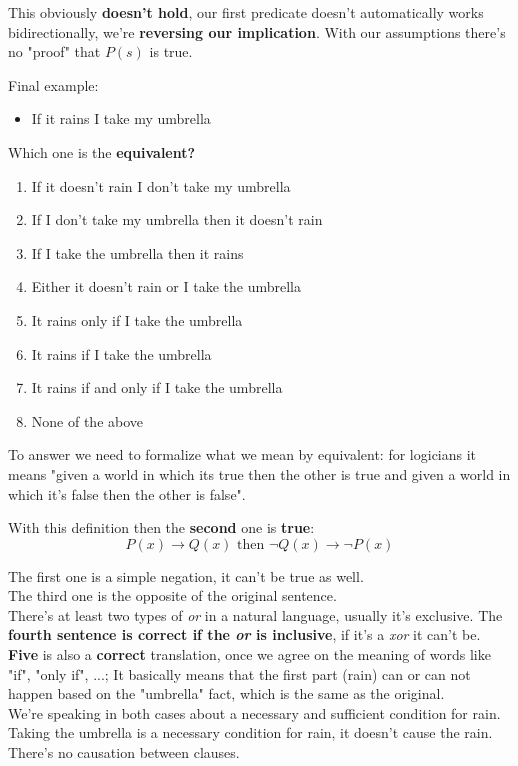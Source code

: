 	This obviously \textbf{doesn't hold}, our first predicate doesn't automatically works bidirectionally, we're \textbf{reversing our implication}. With our assumptions there's no "proof" that $P(s)$ is true.

	\begin{example} Final example:
	\begin{itemize}
		\item If it rains I take my umbrella
	\end{itemize}
	\end{example}

	Which one is the \textbf{equivalent?}
	\begin{enumerate}
		\item If it doesn't rain I don't take my umbrella
		\item If I don't take my umbrella then it doesn't rain
		\item If I take the umbrella then it rains
		\item Either it doesn't rain or I take the umbrella
		\item It rains only if I take the umbrella
		\item It rains if I take the umbrella
		\item It rains if and only if I take the umbrella
		\item None of the above
	\end{enumerate}

	To answer we need to formalize what we mean by equivalent: for logicians it means "given a world in which its true then the other is true and given a world in which it's false then the other is false". \\

	\newpage

	With this definition then the \textbf{second} one is \textbf{true}:
	$$ P(x) \rightarrow Q(x) \text{ then } \neg Q(x) \rightarrow \neg P(x) $$

	The first one is a simple negation, it can't be true as well. \\

	The third one is the opposite of the original sentence. \\

	There's at least two types of \textit{or} in a natural language, usually it's exclusive. The \textbf{fourth sentence is correct if the \textit{or} is inclusive}, if it's a \textit{xor} it can't be. \\

	\textbf{Five} is also a \textbf{correct} translation, once we agree on the meaning of words like "if", "only if", ...; It basically means that the first part (rain) can or can not happen based on the "umbrella" fact, which is the same as the original. \\
	We're speaking in both cases about a necessary and sufficient condition for rain. Taking the umbrella is a necessary condition for rain, it doesn't cause the rain. There's no causation between clauses. \\

